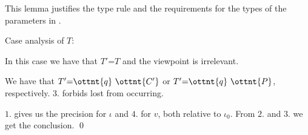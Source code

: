 \noindent
This lemma justifies the type rule  and the
requirements for the types of the parameters in
.


Case analysis of $T$:


In this case we have that $T'  \textsf{=}  T$ and the viewpoint is
irrelevant.



We have that $T'  \textsf{=}    \ottnt{q} \  \ottnt{C'}  $ or $T'  \textsf{=}    \ottnt{q} \  \ottnt{P}  $, respectively.
$3.$ forbids lost from occurring.

$1.$ gives us the precision for $\iota$ and $4.$ for $v$, both
relative to $\iota_{{\mathrm{0}}}$.
From $2.$ and $3.$ we get the conclusion.
\qed
